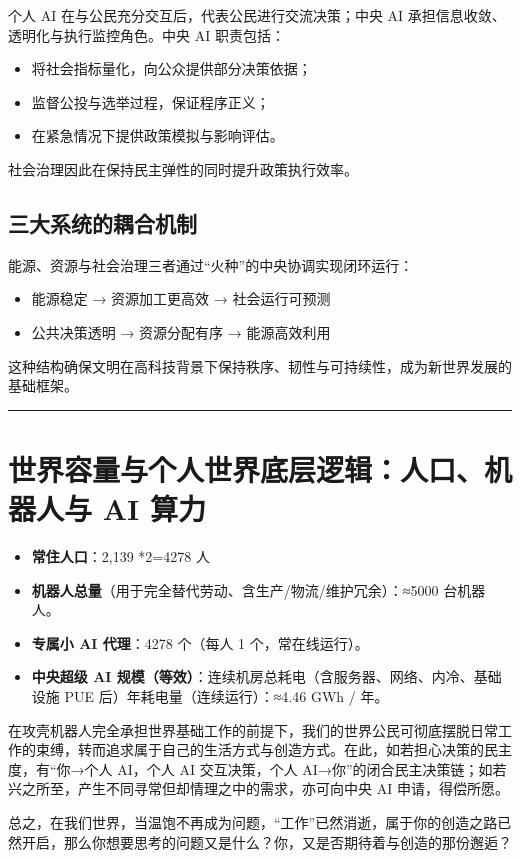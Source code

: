 个人 AI 在与公民充分交互后，代表公民进行交流决策；中央 AI 承担信息收敛、透明化与执行监控角色。中央 AI 职责包括：

\begin{itemize}
\item
  将社会指标量化，向公众提供部分决策依据；
\item
  监督公投与选举过程，保证程序正义；
\item
  在紧急情况下提供政策模拟与影响评估。
\end{itemize}

社会治理因此在保持民主弹性的同时提升政策执行效率。

\subsection{三大系统的耦合机制}\label{ux4e09ux5927ux7cfbux7edfux7684ux8026ux5408ux673aux5236}

能源、资源与社会治理三者通过``火种''的中央协调实现闭环运行：

\begin{itemize}
\item
  能源稳定 → 资源加工更高效 → 社会运行可预测
\item
  公共决策透明 → 资源分配有序 → 能源高效利用
\end{itemize}

这种结构确保文明在高科技背景下保持秩序、韧性与可持续性，成为新世界发展的基础框架。

\begin{center}\rule{0.5\linewidth}{0.5pt}\end{center}

\section{世界容量与个人世界底层逻辑：人口、机器人与 AI 算力}\label{ux4e16ux754cux5bb9ux91cfux4e0eux4e2aux4ebaux4e16ux754cux5e95ux5c42ux903bux8f91ux4ebaux53e3ux673aux5668ux4ebaux4e0e-ai-ux7b97ux529b}

\begin{itemize}
\item
  \textbf{常住人口}：2,139 *2=4278 人
\item
  \textbf{机器人总量}（用于完全替代劳动、含生产/物流/维护冗余）：≈5000 台机器人。
\item
  \textbf{专属小 AI 代理}：4278 个（每人 1 个，常在线运行）。
\item
  \textbf{中央超级 AI 规模（等效）}：连续机房总耗电（含服务器、网络、内冷、基础设施 PUE 后）年耗电量（连续运行）：≈4.46 GWh / 年。
\end{itemize}

在攻壳机器人完全承担世界基础工作的前提下，我们的世界公民可彻底摆脱日常工作的束缚，转而追求属于自己的生活方式与创造方式。在此，如若担心决策的民主度，有``你→个人 AI，个人 AI 交互决策，个人 AI→你''的闭合民主决策链；如若兴之所至，产生不同寻常但却情理之中的需求，亦可向中央 AI 申请，得偿所愿。

总之，在我们世界，当温饱不再成为问题，``工作''已然消逝，属于你的创造之路已然开启，那么你想要思考的问题又是什么？你，又是否期待着与创造的那份邂逅？

